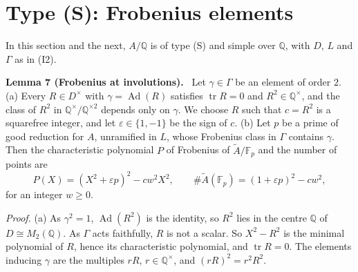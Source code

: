 \documentclass[11pt]{article}
\newenvironment{statement}[1]{\par\medskip\noindent\phantomsection\textbf{#1}\ }{\par\medskip}
\newcommand{\Q}{\mathbb Q}
\newcommand{\F}{\mathbb F}
\DeclareMathOperator{\Ad}{Ad}
\DeclareMathOperator{\tr}{tr}
\begin{document}
\section{Type (S): Frobenius elements}\label{frobenius}

In this section and the next, \(A/\Q\) is of type (S) and simple over \(\Q\), with \(D\), \(L\) and \(\Gamma\) as
in (I2).

\begin{statement}{Lemma 7 (Frobenius at involutions).}\label{lemma-inv}
Let \(\gamma\in\Gamma\) be an element of order \(2\).
(a) Every \(R\in D^\times\) with \(\gamma=\Ad(R)\) satisfies \(\tr R=0\) and \(R^2\in\Q^\times\), and the class of
\(R^2\) in \(\Q^\times/\Q^{\times2}\) depends only on \(\gamma\). We choose \(R\) such that \(c=R^2\) is a
squarefree integer, and let \(\varepsilon\in\{1,-1\}\) be the sign of \(c\).
(b) Let \(p\) be a prime of good reduction for \(A\), unramified in \(L\), whose Frobenius class in \(\Gamma\)
contains \(\gamma\). Then the characteristic polynomial \(P\) of Frobenius of \(\widetilde A/\F_p\) and the number
of points are
\[P(X)=(X^2+\varepsilon p)^2-cw^2X^2,\qquad\#\widetilde A(\F_p)=(1+\varepsilon p)^2-cw^2,\]
for an integer \(w\ge0\).
\end{statement}

\emph{Proof.} (a) As \(\gamma^2=1\), \(\Ad(R^2)\) is the identity, so \(R^2\) lies in the centre \(\Q\) of
\(D\cong M_2(\Q)\). As \(\Gamma\) acts faithfully, \(R\) is not a scalar. So \(X^2-R^2\) is the minimal polynomial
of \(R\), hence its characteristic polynomial, and \(\tr R=0\). The elements inducing \(\gamma\) are the multiples
\(rR\), \(r\in\Q^\times\), and \((rR)^2=r^2R^2\).
\end{document}
